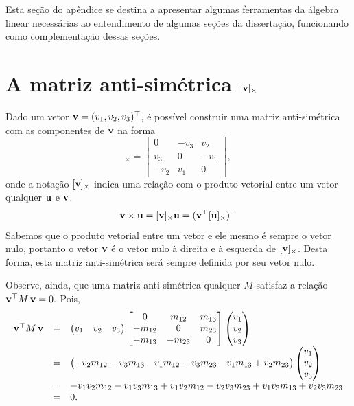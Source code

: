\documentclass[a4paper,12pt,oneside,onecolumn,final,fleqn]{repUERJ}
\begin{document}
Esta seção do apêndice se destina a apresentar algumas ferramentas da álgebra linear necessárias ao entendimento de algumas seções da dissertação, funcionando como complementação dessas seções.

\section{A matriz anti-simétrica $[{\bf v}]_\times$}
Dado um vetor ${\bf v}=(v_1,v_2,v_3)^\top$, é possível construir uma matriz anti-simétrica com as componentes de ${\bf v}$ na forma
\begin{equation*}
[{\bf v}]_\times=
\begin{bmatrix}
0&-v_3&v_2\\
v_3&0&-v_1\\
-v_2&v_1&0
\end{bmatrix},
\end{equation*}
onde a notação $[{\bf v}]_\times$ indica uma relação com o produto vetorial entre um vetor qualquer ${\bf u}$ e ${\bf v}$. 
\begin{equation*}
{\bf v} \times {\bf u} = [{\bf v}]_\times {\bf u} = ({\bf v}^\top [{\bf u}]_\times)^\top
\end{equation*}
Sabemos que o produto vetorial entre um vetor e ele mesmo é sempre o vetor nulo, portanto o vetor ${\bf v}$ é o vetor nulo à direita e à esquerda de $[{\bf v}]_\times$. Desta forma, esta matriz anti-simétrica será sempre definida por seu vetor nulo.  

Observe, ainda, que uma matriz anti-simétrica qualquer $M$ satisfaz a relação ${\bf v}^\top M\,{\bf v}=0.$ Pois,
\begin{equation*}
\begin{array}{rcl}
{\bf v}^\top M\,{\bf v}
&=&
\begin{pmatrix}
v_1&v_2&v_3
\end{pmatrix}
\begin{bmatrix}
0&m_{12}&m_{13}\\
-m_{12}&0&m_{23}\\
-m_{13}&-m_{23}&0
\end{bmatrix}
\begin{pmatrix}
v_1\\
v_2\\
v_3
\end{pmatrix}\\
&=&
\begin{pmatrix}
-v_2 m_{12}-v_3 m_{13}&v_1 m_{12}-v_3 m_{23}&v_1 m_{13}+v_2 m_{23}
\end{pmatrix}
\begin{pmatrix}
v_1\\
v_2\\
v_3
\end{pmatrix}\\
&=&
-v_1 v_2 m_{12}-v_1 v_3 m_{13}+v_1 v_2 m_{12}-v_2 v_3 m_{23}+v_1 v_3 m_{13}+v_2 v_3 m_{23}\\
&=&0.
\end{array}
\end{equation*}
\end{document}
